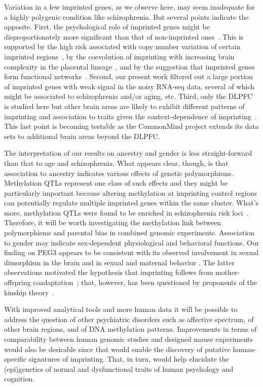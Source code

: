 \documentclass[letterpaper]{article}
\begin{document}
Variation in a few imprinted genes, as we observe here, may seem inadequate
for a highly polygenic condition like schizophrenia.  But several points
indicate the opposite.  First, the psychological role of imprinted genes might
be disproportionately more significant than that of non-imprinted
ones~\cite{Crespi2008a}.  This is supported by the high risk associated with
copy number variation of certain imprinted regions~\cite{McNamara2013}, by the
coevolution of imprinting with increasing brain complexity in the placental
lineage~\cite{Renfree2012}, and by the suggestion that imprinted genes form
functional networks~\cite{Varrault2006}.  Second, our present work filtered
out a large portion of imprinted genes with weak signal in the noisy RNA-seq
data, several of which might be associated to schizophrenia and/or aging, etc.
Third, only the DLPFC is studied here but other brain areas are likely to
exhibit different patterns of imprinting and association to traits given the
context-dependence of imprinting~\cite{Perez2015,DeVeale2012}.  This last
point is becoming testable as the CommonMind project extends its data sets to
additional brain areas beyond the DLPFC.

The interpretation of our results on ancestry and gender is less
straight-forward than that to age and schizophrenia.  What appears clear,
though, is that association to ancestry indicates various effects of genetic
polymorphisms.   Methylation QTLs represent one class of such effects and they
might be particularly important because altering methylation at imprinting
control regions can potentially regulate multiple imprinted genes within the
same cluster.  What's more, methylation QTLs were found to be enriched in
schizophrenia risk loci~\cite{Hannon2016}.  Therefore, it will be worth
investigating the methylation link between polymorphisms and parental bias in
combined genomic experiments.  Association to gender may indicate
sex-dependent physiological and behavioral functions.  Our finding on PEG3
appears to be consistent with its observed involvement in sexual dimorphism in
the brain and in sexual and maternal behavior \cite{Broad2009}.  The latter
observations motivated the hypothesis that imprinting follows from
mother-offspring coadaptation~\cite{Keverne2015}; that, however, has been
questioned by proponents of the kinship theory~\cite{Haig2014}.

With improved analytical tools and more human data it will be possible to
address the question of other psychiatric disorders such as affective
spectrum, of other brain regions, and of DNA methylation patterns.
Improvements in terms of comparability between human genomic studies and
designed mouse experiments would also be desirable since that would enable
the discovery of putative human-specific signatures of imprinting.  That, in
turn, would help elucidate the (epi)genetics of normal and dysfunctional
traits of human psychology and cognition.
\end{document}
